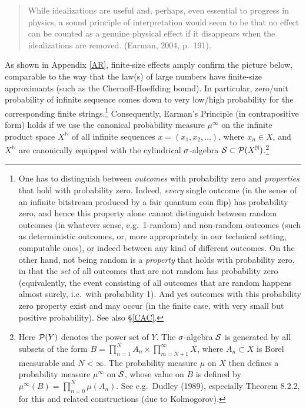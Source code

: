 \documentclass[11pt,a4paper]{article}
\numberwithin{equation}{section}
\newcommand{\x}{\times}
\newcommand{\N}{{\mathbb N}} \newcommand{\R}{{\mathbb R}}
\begin{document}
  \begin{quote}\begin{small}
While idealizations are useful and, perhaps, even essential to progress in physics, a sound principle of interpretation would seem to be that no effect  can be counted as  a genuine physical effect if it disappears
when the idealizations are removed.  (Earman, 2004, p.\ 191).
\end{small}\end{quote}
 As shown in Appendix \ref{AR}, finite-size effects amply confirm the picture below, comparable to the way that
 the law(s) of large numbers have finite-size approximants (such as the Chernoff-Hoeffding bound). In particular, zero/unit probability of  infinite sequence comes down to very low/high  probability for the corresponding finite strings.\footnote{One has to  distinguish between \emph{outcomes} with probability zero and \emph{properties} that hold with probability zero. Indeed, \emph{every} single outcome (in the sense of an infinite bitstream produced by a fair quantum coin flip) has probability zero, and hence this property alone cannot distinguish between random outcomes (in whatever sense, e.g.\ 1-random) and non-random outcomes (such as deterministic outcomes, or, more appropriately in our technical setting, computable ones), or indeed between any kind of different outcomes. On the other hand, not being random is a \emph{property} that holds with probability zero, in that the \emph{set} of all outcomes that are not random has probability zero (equivalently, the event consisting of all outcomes that are random happens almost surely, i.e.\ with probability 1). And yet outcomes with this probability zero property exist and may occur (in the finite case, with very small but positive probability).
 See also \S\ref{CAC}.}
 Consequently, Earman's Principle (in contrapositive form) holds  if we use the canonical probability measure $\mu^{\infty}$ on the 
  infinite product space $X^{\N}$ of all infinite sequences $x=(x_1, x_2, \ldots)$, where $x_n\in X$, 
  and $X^{\N}$ are canonically equipped with the cylindrical  $\sigma$-algebra $\CS\subset \CP(X^{\N})$.\footnote{\label{sigma}
Here ${\mathcal P}(Y)$ denotes the power set of $Y$. The $\sigma$-algebra ${\mathcal S}$ is generated by all subsets of the form 
$B= \prod_{n=1}^N A_n\x \prod_{m=N+1}^{\infty} X$,
where  $A_n\subset X $ is Borel measurable and $N<\infty$. The probability measure $\mu$ on $X$ then defines a probability measure $\mu^{\infty}$ on ${\mathcal S}$, whose value  on  $B$ is defined by
$\mu^{\infty}(B)=\prod_{n=0}^N \mu(A_n)$. See e.g.\ Dudley (1989), especially Theorem 8.2.2, for this and related constructions (due to Kolmogorov). }
\end{document}
